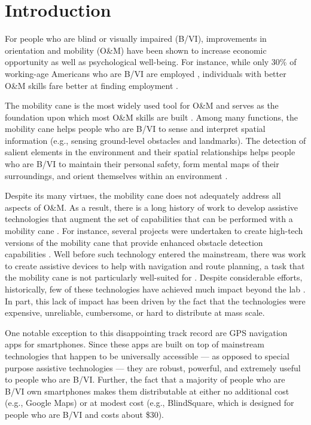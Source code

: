 \documentclass[chi_draft]{sigchi}
\newcommand{\BVI}{B/VI\xspace}
\newcommand{\OM}{O\&M\xspace}
\begin{document}
\section{Introduction}
For people who are blind or visually impaired (\BVI), improvements in orientation and mobility (\OM) have been shown to increase economic opportunity as well as psychological well-being.  For instance, while only 30\% of working-age Americans who are \BVI are employed \cite{employmentstatistics2017, kirchner1999looking}, individuals with better \OM skills fare better at finding employment \cite{crudden1998comprehensive, crudden1999barriers, leonard1999factors, o1999employment}.

The mobility cane is the most widely used tool for \OM and serves as the foundation upon which most \OM skills are built \cite{wiener2010foundations}.  Among many functions, the mobility cane helps people who are \BVI to sense and interpret spatial information (e.g., sensing ground-level obstacles and landmarks).  The detection of salient elements in the environment and their spatial relationships helps people who are \BVI to maintain their personal safety, form mental maps of their surroundings, and orient themselves within an environment \cite{thinus1997representation, schinazi2016spatial}.

Despite its many virtues, the mobility cane does not adequately address all aspects of \OM.  As a result, there is a long history of work to develop assistive technologies that augment the set of capabilities that can be performed with a mobility cane \cite{wiener2010foundations}.  For instance, several projects were undertaken to create high-tech versions of the mobility cane that provide enhanced obstacle detection capabilities \cite{benjamin1973new, borenstein1997guidecane}.  Well before such technology entered the mainstream, there was  work to create assistive devices to help with navigation and route planning, a task that the mobility cane is not particularly well-suited for \cite{dakopoulos2010wearable}.  Despite considerable efforts, historically, few of these technologies have achieved much impact beyond the lab \cite{wiener2010foundations}.  In part, this lack of impact has been driven by the fact that the technologies were expensive, unreliable, cumbersome, or hard to distribute at mass scale.

One notable exception to this disappointing track record are GPS navigation apps for smartphones.  Since these apps are built on top of mainstream technologies that happen to be universally accessible --- as opposed to special purpose assistive technologies --- they are robust, powerful, and extremely useful to people who are \BVI.  Further, the fact that a majority of people who are \BVI own smartphones \cite{morris2014blind} makes them distributable at either no additional cost (e.g., Google Maps) or at modest cost (e.g., BlindSquare, which is designed for people who are \BVI and costs about \$30).
\end{document}
